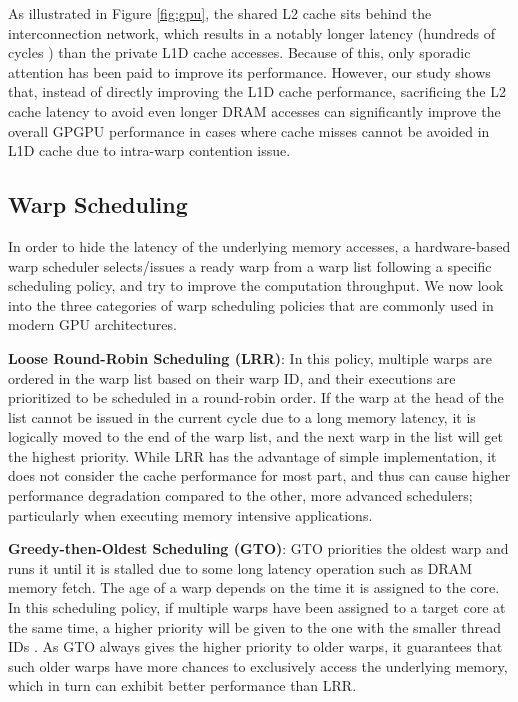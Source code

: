 \documentclass{sigplanconf}
\begin{document}
As illustrated in Figure \ref{fig:gpu}, the shared L2 cache sits behind the interconnection network, which results in a notably longer latency (hundreds of cycles \cite{wong2010demystifying}) than the private L1D cache accesses. Because of this, only sporadic attention has been paid to improve its performance. However, our study shows that, instead of directly improving the L1D cache performance, sacrificing the L2 cache latency to avoid even longer DRAM accesses can significantly improve the overall GPGPU performance in cases where cache misses cannot be avoided in L1D cache due to intra-warp contention issue.

\subsection{Warp Scheduling}

In order to hide the latency of the underlying memory accesses, a hardware-based warp scheduler selects/issues a ready warp from a warp list following a specific scheduling policy, and try to improve the computation throughput. We now look into the three categories of warp scheduling policies that are commonly used in modern GPU architectures.

\noindent\textbf{Loose Round-Robin Scheduling (LRR)}: In this policy, multiple warps are ordered in the warp list based on their warp ID, and their executions are prioritized to be scheduled in a round-robin order. If the warp at the head of the list cannot be issued in the current cycle due to a long memory latency, it is logically moved to the end of the warp list, and the next warp in the list will get the highest priority.
While LRR has the advantage of simple implementation, it does not consider the cache performance for most part, and thus can cause higher performance degradation compared to the other, more advanced schedulers; particularly when executing memory intensive applications.

\noindent\textbf{Greedy-then-Oldest Scheduling (GTO)}: GTO priorities the oldest warp and runs it until it is stalled due to some long latency operation such as DRAM memory fetch. The age of a warp depends on the time it is assigned to the core. In this scheduling policy, if multiple warps have been assigned to a target core at the same time, a higher priority will be given to the one with the smaller thread IDs \cite{rogers2012cache}. As GTO always gives the higher priority to older warps, it guarantees that such older warps have more chances to exclusively access the underlying memory, which in turn can exhibit better performance than LRR.
\end{document}
